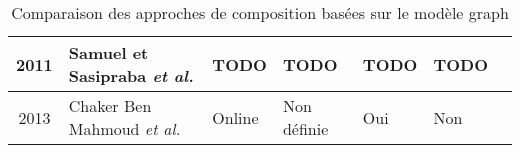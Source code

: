 \begin{table}[htb!]
{\begin{tabular}{|c|>{\centering\arraybackslash}m{1.5in}|>{\centering\arraybackslash}m{0.9in}|>{\centering\arraybackslash}m{1.5in}|>{\centering\arraybackslash}m{1in}|>{\centering\arraybackslash}m{1.4in}|@{}m{0pt}@{}}
    \hline %
    2011    & Samuel et Sasipraba \textit{et al.} \cite{samuel2011approach}& TODO & TODO & TODO & TODO&\\[10ex]
    \hline %
    2013    & Chaker Ben Mahmoud \textit{et al.} \cite{mahmoud2013towards} &Online & Non définie & Oui & Non &\\[6ex] %
    \hline %
  \end{tabular}}
  \newline
  \caption{Comparaison des approches de composition basées sur le modèle graph}
  \label{comparaison-graph-composition}
\end{table}
